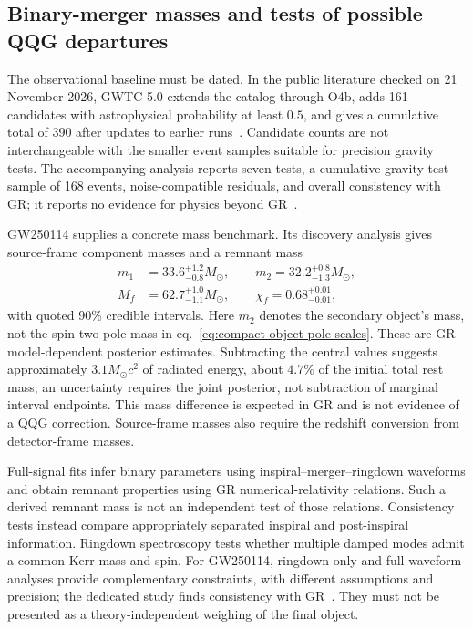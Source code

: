 \subsection{Binary-merger masses and tests of possible QQG departures}
\label{sec:merger-mass-tests}

The observational baseline must be dated.  In the public literature checked on 21 November 2026, GWTC-5.0 extends the catalog through O4b, adds 161 candidates with astrophysical probability at least $0.5$, and gives a cumulative total of 390 after updates to earlier runs~\cite{LVK:GWTC5}.  Candidate counts are not interchangeable with the smaller event samples suitable for precision gravity tests.  The accompanying analysis reports seven tests, a cumulative gravity-test sample of 168 events, noise-compatible residuals, and overall consistency with GR; it reports no evidence for physics beyond GR~\cite{LVK:GWTC5Tests}.

GW250114 supplies a concrete mass benchmark.  Its discovery analysis gives source-frame component masses and a remnant mass~\cite{LVK:GW250114Masses}
\begin{equation}
 \begin{split}
 m_1&=33.6^{+1.2}_{-0.8}M_\odot,\qquad
 m_2=32.2^{+0.8}_{-1.3}M_\odot,\\
 M_f&=62.7^{+1.0}_{-1.1}M_\odot,\qquad
 \chi_f=0.68^{+0.01}_{-0.01},
 \end{split}
 \label{eq:gw250114-masses}
\end{equation}
with quoted 90\% credible intervals.  Here $m_2$ denotes the secondary object's mass, not the spin-two pole mass in eq.~\eqref{eq:compact-object-pole-scales}.  These are GR-model-dependent posterior estimates.  Subtracting the central values suggests approximately $3.1M_\odot c^2$ of radiated energy, about $4.7\%$ of the initial total rest mass; an uncertainty requires the joint posterior, not subtraction of marginal interval endpoints.  This mass difference is expected in GR and is not evidence of a QQG correction.  Source-frame masses also require the redshift conversion from detector-frame masses.

Full-signal fits infer binary parameters using inspiral--merger--ringdown waveforms and obtain remnant properties using GR numerical-relativity relations.  Such a derived remnant mass is not an independent test of those relations.  Consistency tests instead compare appropriately separated inspiral and post-inspiral information.  Ringdown spectroscopy tests whether multiple damped modes admit a common Kerr mass and spin.  For GW250114, ringdown-only and full-waveform analyses provide complementary constraints, with different assumptions and precision; the dedicated study finds consistency with GR~\cite{LVK:GW250114Spectroscopy}.  They must not be presented as a theory-independent weighing of the final object.

